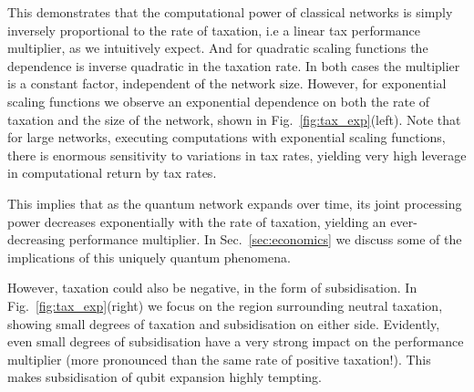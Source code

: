 This demonstrates that the computational power of classical networks is simply inversely proportional to the rate of taxation, i.e a linear tax performance multiplier, as we intuitively expect. And for quadratic scaling functions the dependence is inverse quadratic in the taxation rate. In both cases the multiplier is a constant factor, independent of the network size. However, for exponential scaling functions we observe an exponential dependence on both the rate of taxation and the size of the network, shown in Fig.~\ref{fig:tax_exp}(left). Note that for large networks, executing computations with exponential scaling functions, there is enormous sensitivity to variations in tax rates, yielding very high leverage in computational return by tax rates.

This implies that as the quantum network expands over time, its joint processing power decreases exponentially with the rate of taxation, yielding an ever-decreasing performance multiplier. In Sec.~\ref{sec:economics} we discuss some of the implications of this uniquely quantum phenomena.

However, taxation could also be negative, in the form of subsidisation. In Fig.~\ref{fig:tax_exp}(right) we focus on the region surrounding neutral taxation, showing small degrees of taxation and subsidisation on either side. Evidently, even small degrees of subsidisation have a very strong impact on the performance multiplier (more pronounced than the same rate of positive taxation!). This makes subsidisation of qubit expansion highly tempting.

